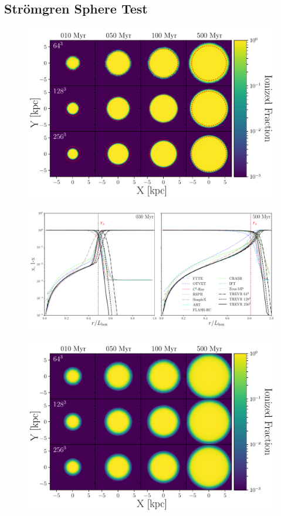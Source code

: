 \documentclass[fleq,usenatbib]{mnras}
\begin{document}
\subsection{Str\"{o}mgren Sphere Test}
\begin{figure}
\includegraphics[width=1\linewidth]{Figures/strom_slice_iso.pdf}
\caption{}
\label{fig:stromsliceiso}
\end{figure}
\begin{figure}
\includegraphics[width=1\linewidth]{Figures/strom_iso_fraction.pdf}
\caption{}
\label{fig:stromiso}
\end{figure}
\begin{figure}
\includegraphics[width=1\linewidth]{Figures/strom_slice.pdf}
\caption{}
\label{fig:stromslice}
\end{figure}
\end{document}
